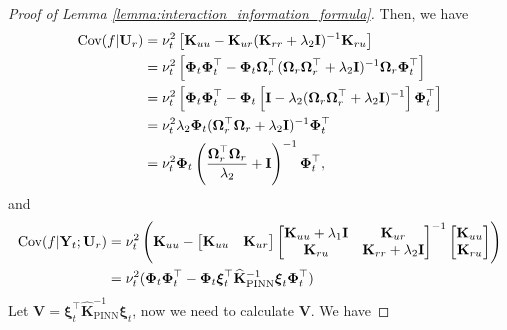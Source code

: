 \begin{proof}[Proof of Lemma \ref{lemma:interaction_information_formula}]
Then, we have
\begin{align}
    \textup{Cov}(f \rvert \mathbf{U}_r) &=  \nu_t^2 \left[ \mathbf{K}_{uu} - \mathbf{K}_{ur}(\mathbf{K}_{rr}+ \lambda_2\mathbf{I})^{-1} \mathbf{K}_{ru} \right]
        \\
        &= \nu_t^2 \left[\boldsymbol{\Phi}_t \boldsymbol{\Phi}_t^\top - \boldsymbol{\Phi}_t\boldsymbol{\Omega}_r^\top (\boldsymbol{\Omega}_r\boldsymbol{\Omega}_r^\top + \lambda_2\mathbf{I})^{-1} \boldsymbol{\Omega}_r\boldsymbol{\Phi}_t^\top \right]
        \\
        &= \nu_t^2 \left[\boldsymbol{\Phi}_t\boldsymbol{\Phi}_t^\top - \boldsymbol{\Phi}_t\left[\mathbf{I} - \lambda_2(\boldsymbol{\Omega}_r\boldsymbol{\Omega}_r^\top + \lambda_2\mathbf{I})^{-1}\right] \boldsymbol{\Phi}_t^\top \right] 
        \\
        &= \nu_t^2 \lambda_2 \boldsymbol{\Phi}_t (\boldsymbol{\Omega}_r^\top \boldsymbol{\Omega}_r + \lambda_2\mathbf{I})^{-1} \boldsymbol{\Phi}_t^\top
        \\ \label{Eqn:covar_f_condition_on_u}
        &= \nu_t^2 \boldsymbol{\Phi}_t \left(\frac{\boldsymbol{\Omega}_r^\top \boldsymbol{\Omega}_r}{\lambda_2} + \mathbf{I}\right)^{-1} \boldsymbol{\Phi}_t^\top,
\end{align}
and 
\begin{align}
\label{Eqn:covar_f_condition_on_y_and_u}
        \textup{Cov}(f \rvert \mathbf{Y}_t; \mathbf{U}_r) &= \nu_t^2 \left(\mathbf{K}_{uu} - \begin{bmatrix}
            \mathbf{K}_{uu} & \mathbf{K}_{ur}
        \end{bmatrix} \begin{bmatrix}
            \mathbf{K}_{uu} + \lambda_1\mathbf{I} & \mathbf{K}_{ur} \\
            \mathbf{K}_{ru} & \mathbf{K}_{rr} + \lambda_2 \mathbf{I}
        \end{bmatrix}^{-1} \begin{bmatrix}
            \mathbf{K}_{uu} \\
            \mathbf{K}_{ru}
        \end{bmatrix} \right) \\
        & = \nu_t^2 (\boldsymbol{\Phi}_t \boldsymbol{\Phi}_t^\top - \boldsymbol{\Phi}_t \boldsymbol{\xi}_t^\top \mathbf{\widehat{K}}_\mathrm{PINN}^{-1} \boldsymbol{\xi}_t \boldsymbol{\Phi}_t^\top) 
\end{align}
Let $\mathbf{V} = \boldsymbol{\xi}_t^\top \mathbf{\widehat{K}}_\mathrm{PINN}^{-1} \boldsymbol{\xi}_t$, now we need to calculate $\mathbf{V}$. We have

\end{proof}
